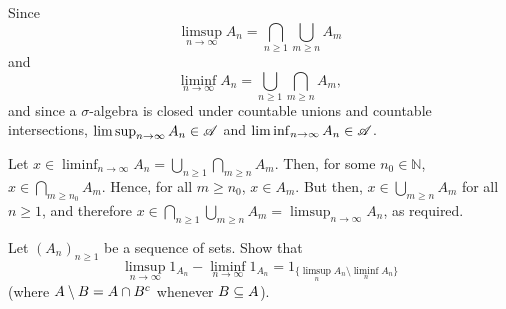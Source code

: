\begin{solution}
    Since
    \[ \limsup_{n \to \infty} A_n = \bigcap_{n \geq 1} \bigcup_{m \geq n} A_m \]
    and
    \[ \liminf_{n \to \infty} A_n = \bigcup_{n \geq 1} \bigcap_{m \geq n} A_m, \]
    and since a $\sigma$-algebra is closed under countable unions and countable intersections, $\limsup_{n \to \infty} A_n \in \mathscr{A}$ and $ \liminf_{n \to \infty} A_n \in \mathscr{A}$.

    Let $x \in \liminf_{n \to \infty} A_n = \bigcup_{n \geq 1} \bigcap_{m \geq n} A_m$. Then, for some $n_0 \in \mathbb{N}$, $x \in \bigcap_{m \geq n_0} A_m$. Hence, for all $m \geq n_0$, $x \in A_m$. But then, $x \in \bigcup_{m \geq n} A_m$ for all $n \geq 1$, and therefore $x \in \bigcap_{n \geq 1}\bigcup_{m \geq n} A_m = \limsup_{n \to \infty}A_n$, as required. 
\end{solution}


\begin{problem}
    Let $(A_n)_{n \geq 1}$ be a sequence of sets. Show that
    \[ \limsup_{n \to \infty} 1_{A_n} -  \liminf_{n \to \infty} 1_{A_n} = 1_{\{\limsup_n A_n \setminus \liminf_n A_n\}}\]
    (where $A \setminus B = A \cap B^c$ whenever $B \subseteq A$).
\end{problem}

